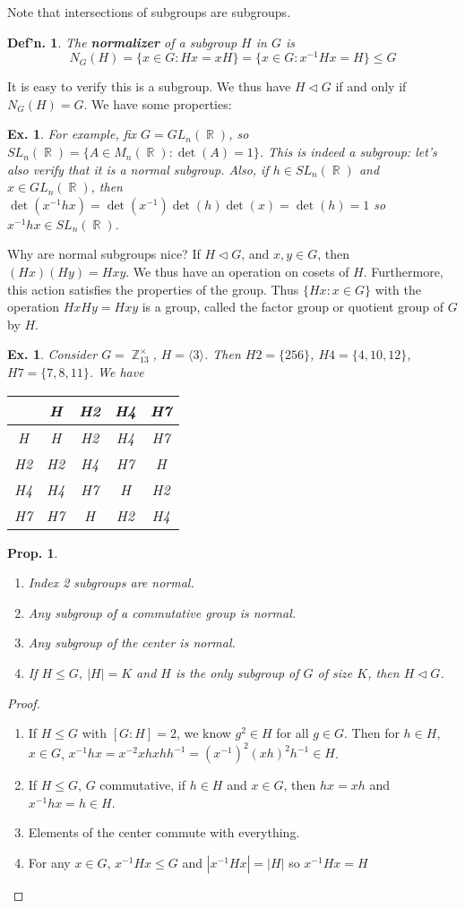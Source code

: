 \documentclass[12pt, a4paper]{book}
\DeclareMathOperator{\Z}{\mathbb{Z}}
\DeclareMathOperator{\R}{\mathbb{R}}
\newtheorem{definition}[theorem]{Def'n.}
\newtheorem{proposition}[theorem]{Prop.}
\newtheorem{example}[theorem]{Ex.}
\theoremstyle{nonumberplain}
\newtheorem{proof}{Proof}
\begin{document}
Note that intersections of subgroups are subgroups.
\begin{definition}
    The \textbf{normalizer} of a subgroup $H$ in $G$ is
    \[N_G(H)=\{x\in G:Hx=xH\}=\{x\in G:x^{-1}Hx=H\}\leq G\]
\end{definition}
It is easy to verify this is a subgroup.
We thus have $H\triangleleft G$ if and only if $N_G(H)=G$.
We have some properties:
\begin{example}
    For example, fix $G=GL_n(\R)$, so $SL_n(\R)=\{A\in M_n(\R):\det(A)=1\}$.
    This is indeed a subgroup: let's also verify that it is a normal subgroup.
    Also, if $h\in SL_n(\R)$ and $x\in GL_n(\R)$, then $\det(x^{-1}hx)=\det(x^{-1})\det(h)\det(x)=\det(h)=1$ so $x^{-1}hx\in SL_n(\R)$.
\end{example}
Why are normal subgroups nice?
If $H\triangleleft G$, and $x,y\in G$, then $(Hx)(Hy)=Hxy$.
We thus have an operation on cosets of $H$.
Furthermore, this action satisfies the properties of the group.
Thus $\{Hx:x\in G\}$ with the operation $HxHy=Hxy$ is a group, called the factor group or quotient group of $G$ by $H$.
\begin{example}
    Consider $G=\Z^\times_{13}$, $H=\langle 3\rangle$.
    Then $H2=\{256\}$, $H4=\{4,10,12\}$, $H7=\{7,8,11\}$.
    We have
    \begin{tabular}{c|c|c|c|c|}
        &H&H2&H4&H7\\
        \hline
        H &H&H2&H4&H7\\
        H2&H2&H4&H7&H\\
        H4&H4&H7&H&H2\\
        H7&H7&H&H2&H4
    \end{tabular}
\end{example}
\begin{proposition}
    \begin{enumerate}
        \item Index 2 subgroups are normal.
        \item Any subgroup of a commutative group is normal.
        \item Any subgroup of the center is normal.
        \item If $H\leq G$, $|H|=K$ and $H$ is the only subgroup of $G$ of size $K$, then $H\triangleleft G$.
    \end{enumerate}
\end{proposition}
\begin{proof}
    \begin{enumerate}
        \item If $H\leq G$ with $[G:H]=2$, we know $g^2\in H$ for all $g\in G$.
            Then for $h\in H$, $x\in G$, $x^{-1}hx=x^{-2}xhxhh^{-1}=(x^{-1})^2(xh)^2h^{-1}\in H$.
        \item If $H\leq G$, $G$ commutative, if $h\in H$ and $x\in G$, then $hx=xh$ and $x^{-1}hx=h\in H$.
        \item Elements of the center commute with everything.
        \item For any $x\in G$, $x^{-1}Hx\leq G$ and $|x^{-1}Hx|=|H|$ so $x^{-1}Hx=H$
    \end{enumerate}
\end{proof}
\end{document}
